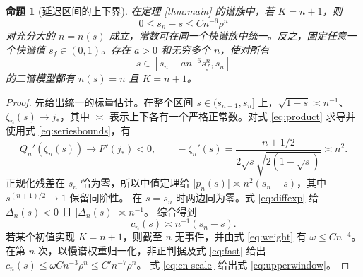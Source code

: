 \documentclass[11pt,a4paper,UTF8,fontset=fandol]{ctexart}
\newtheorem{proposition}[theorem]{命题}
\begin{document}
\begin{proposition}[延迟区间的上下界]\label{prop:window}
在定理 \ref{thm:main} 的谱族中，若 \(K=n+1\)，则
\begin{equation}
 0\le s_n-s\le C n^{-6}\rho^n
 \label{eq:upperwindow}
\end{equation}
对充分大的 \(n=n(s)\) 成立，常数可在同一个快谱族中统一。反之，固定任意一个快谱值 \(s_f\in(0,1)\)。存在 \(a>0\) 和无穷多个 \(n\)，使对所有
\begin{equation}
 s\in[s_n-a n^{-6}s_f^n,s_n]
 \label{eq:lowerwindow}
\end{equation}
的二谱模型都有 \(n(s)=n\) 且 \(K=n+1\)。
\end{proposition}
\begin{proof}
先给出统一的标量估计。在整个区间 \(s\in(s_{n-1},s_n]\) 上，\(\sqrt{1-s}\asymp n^{-1}\)、\(\zeta_n(s)\to j_*\)，其中 \(\asymp\) 表示上下各有一个严格正常数。对式 \eqref{eq:product} 求导并使用式 \eqref{eq:seriesbounds}，有
\[
 Q_n'(\zeta_n(s))\to F'(j_*)<0,\qquad
 -\zeta_n'(s)=\frac{n+1/2}{2\sqrt{s}\sqrt{2(1-\sqrt{s})}}
 \asymp n^2 .
\]
正规化残差在 \(s_n\) 恰为零，所以中值定理给
\(\lvert p_n(s)\rvert\asymp n^2(s_n-s)\)，其中
\(s^{(n+1)/2}\to1\) 保留同阶性。
在 \(s=s_n\) 时两边同为零。式 \eqref{eq:diffexp} 给
\(\Delta_n(s)<0\) 且 \(\lvert\Delta_n(s)\rvert\asymp n^{-1}\)。
综合得到
\begin{equation}
 c_n(s)\asymp n^{-1}(s_n-s).
 \label{eq:cn-scale}
\end{equation}
若某个初值实现 \(K=n+1\)，则截至 \(n\) 无事件，并由式 \eqref{eq:weight} 有 \(\omega\le Cn^{-4}\)。在第 \(n\) 次，以慢谱权重归一化，非正判据及式 \eqref{eq:fast} 给出
\(c_n(s)\le \omega Cn^{-3}\rho^n\le C'n^{-7}\rho^n\)。
式 \eqref{eq:cn-scale} 给出式 \eqref{eq:upperwindow}。


\end{proof}
\end{document}

